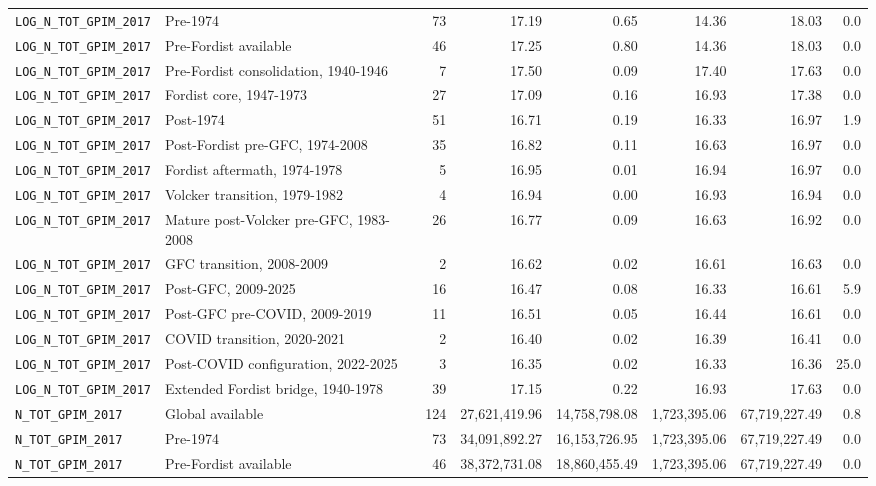 \begin{landscape}
\begin{longtable}{p{4.4cm}p{3.8cm}rrrrrr}
\\
\nolinkurl{LOG_N_TOT_GPIM_2017} & Pre-1974 & 73 & 17.19 & 0.65 & 14.36 & 18.03 & 0.0
\\
\nolinkurl{LOG_N_TOT_GPIM_2017} & Pre-Fordist available & 46 & 17.25 & 0.80 & 14.36 & 18.03 & 0.0
\\
\nolinkurl{LOG_N_TOT_GPIM_2017} & Pre-Fordist consolidation, 1940-1946 & 7 & 17.50 & 0.09 & 17.40 & 17.63 & 0.0
\\
\nolinkurl{LOG_N_TOT_GPIM_2017} & Fordist core, 1947-1973 & 27 & 17.09 & 0.16 & 16.93 & 17.38 & 0.0
\\
\nolinkurl{LOG_N_TOT_GPIM_2017} & Post-1974 & 51 & 16.71 & 0.19 & 16.33 & 16.97 & 1.9
\\
\nolinkurl{LOG_N_TOT_GPIM_2017} & Post-Fordist pre-GFC, 1974-2008 & 35 & 16.82 & 0.11 & 16.63 & 16.97 & 0.0
\\
\nolinkurl{LOG_N_TOT_GPIM_2017} & Fordist aftermath, 1974-1978 & 5 & 16.95 & 0.01 & 16.94 & 16.97 & 0.0
\\
\nolinkurl{LOG_N_TOT_GPIM_2017} & Volcker transition, 1979-1982 & 4 & 16.94 & 0.00 & 16.93 & 16.94 & 0.0
\\
\nolinkurl{LOG_N_TOT_GPIM_2017} & Mature post-Volcker pre-GFC, 1983-2008 & 26 & 16.77 & 0.09 & 16.63 & 16.92 & 0.0
\\
\nolinkurl{LOG_N_TOT_GPIM_2017} & GFC transition, 2008-2009 & 2 & 16.62 & 0.02 & 16.61 & 16.63 & 0.0
\\
\nolinkurl{LOG_N_TOT_GPIM_2017} & Post-GFC, 2009-2025 & 16 & 16.47 & 0.08 & 16.33 & 16.61 & 5.9
\\
\nolinkurl{LOG_N_TOT_GPIM_2017} & Post-GFC pre-COVID, 2009-2019 & 11 & 16.51 & 0.05 & 16.44 & 16.61 & 0.0
\\
\nolinkurl{LOG_N_TOT_GPIM_2017} & COVID transition, 2020-2021 & 2 & 16.40 & 0.02 & 16.39 & 16.41 & 0.0
\\
\nolinkurl{LOG_N_TOT_GPIM_2017} & Post-COVID configuration, 2022-2025 & 3 & 16.35 & 0.02 & 16.33 & 16.36 & 25.0
\\
\nolinkurl{LOG_N_TOT_GPIM_2017} & Extended Fordist bridge, 1940-1978 & 39 & 17.15 & 0.22 & 16.93 & 17.63 & 0.0
\\
\nolinkurl{N_TOT_GPIM_2017} & Global available & 124 & 27,621,419.96 & 14,758,798.08 & 1,723,395.06 & 67,719,227.49 & 0.8
\\
\nolinkurl{N_TOT_GPIM_2017} & Pre-1974 & 73 & 34,091,892.27 & 16,153,726.95 & 1,723,395.06 & 67,719,227.49 & 0.0
\\
\nolinkurl{N_TOT_GPIM_2017} & Pre-Fordist available & 46 & 38,372,731.08 & 18,860,455.49 & 1,723,395.06 & 67,719,227.49 & 0.0

\end{longtable}
\end{landscape}
